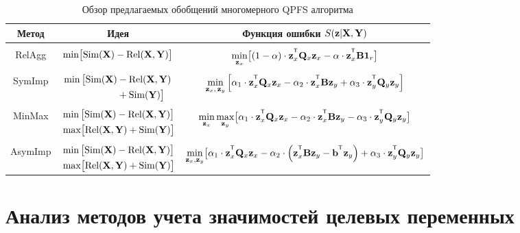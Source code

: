 \begin{table}[ht]
	\centering
	\caption{Обзор предлагаемых обобщений многомерного QPFS алгоритма}
	\small{
		\begin{tabular}{c|c|c}
			\hline
			Метод & Идея & Функция ошибки $S(\mathbf{z} | \mathbf{X}, \mathbf{Y})$ \\
			\hline && \\ [-.5em]
			RelAgg & $\min \bigl[ \text{Sim}(\mathbf{X}) - \text{Rel}(\mathbf{X}, \mathbf{Y}) \bigr] $ & $\min\limits_{\bz_x} \bigl[ (1 - \alpha) \cdot \bz_x^{\T} \bQ_x \bz_x - \alpha \cdot \bz_x^{\T} \bB \bOne_r \bigr] $ \\ &&\\[-.5em]
			SymImp & $\begin{aligned} \min \, \bigl[ \text{Sim}(\mathbf{X}) & - \text{Rel}(\mathbf{X}, \mathbf{Y}) \\ & + \text{Sim}(\mathbf{Y}) \bigr] \end{aligned}$ & $ \min\limits_{\bz_x, \, \bz_y} \left[ \alpha_1 \cdot \bz_x^{\T} \bQ_x \bz_x - \alpha_2 \cdot \bz_x^{\T} \bB \bz_y + \alpha_3 \cdot \bz_y^{\T} \bQ_y \bz_y \right] $\\ &&\\ [-.5em]
			MinMax & $\begin{aligned} &\min \, \bigl[ \text{Sim}(\mathbf{X}) - \text{Rel}(\mathbf{X}, \mathbf{Y}) \bigr]  \\ & \max \bigl[\text{Rel}(\mathbf{X}, \mathbf{Y}) + \text{Sim}(\mathbf{Y}) \bigr] \end{aligned}$ & $	\min\limits_{\bz_x} 	\max\limits_{\bz_y} \bigl[\alpha_1 \cdot \bz_x^{\T} \bQ_x \bz_x - \alpha_2 \cdot \bz_x^{\T} \bB \bz_y - \alpha_3 \cdot \bz_y^{\T} \bQ_y \bz_y \bigr]$ \\ &&\\ [-.5em]
			AsymImp & $\begin{aligned} & \min \, \bigl[ \text{Sim}(\mathbf{X}) - \text{Rel}(\mathbf{X}, \mathbf{Y}) \bigr]\\ &  \max \bigl[\text{Rel}(\mathbf{X}, \mathbf{Y}) + \text{Sim}(\mathbf{Y}) \bigr] \end{aligned}$ & $\min\limits_{\bz_x, \bz_y} \bigl[ \alpha_1 \cdot \bz_x^{\T} \bQ_x \bz_x - \alpha_2 \cdot \left(\bz_x^{\T} \bB \bz_y - \bb^{\T} \bz_y \right) + \alpha_3 \cdot \bz_y^{\T} \bQ_y \bz_y \bigr]$\\ 
			\hline
	\end{tabular}}
	\label{ch2:tbl:summary}
\end{table}


\section{Анализ методов учета значимостей целевых переменных}
\label{sec:ch3:exp_mqpfs}

